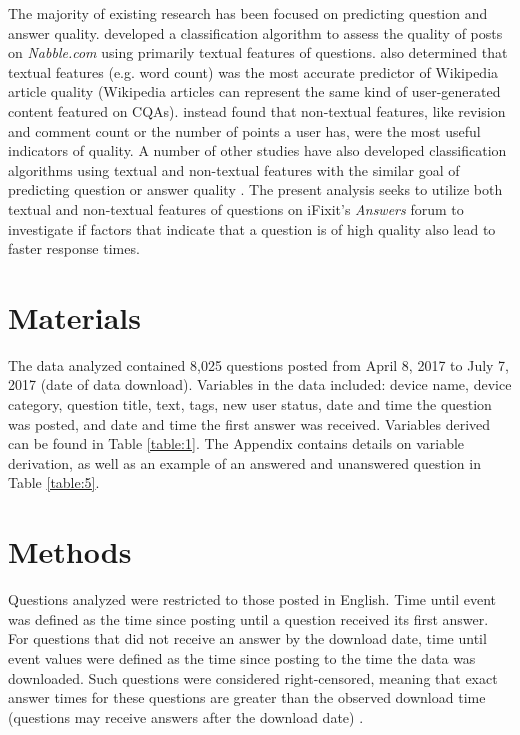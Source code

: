 \documentclass[]{interact}\usepackage[]{graphicx}\usepackage[]{color}
\begin{document}
The majority of existing research has been focused on predicting question and answer quality. \cite{Weimer2007} developed a classification algorithm to assess the quality of posts on \textit{Nabble.com} using primarily textual features of questions. \cite{Blumenstock2008} also determined that textual features (e.g. word count) was the most accurate predictor of Wikipedia article quality (Wikipedia articles can represent the same kind of user-generated content featured on CQAs). \cite{Fu2015} instead found that non-textual features, like revision and comment count or the number of points a user has, were the most useful indicators of quality. A number of other studies have also developed classification algorithms using textual and non-textual features with the similar goal of predicting question or answer quality \cite{Yao2015, Toba2014, Ponzanelli2014a, Ravi2014}. The present analysis seeks to utilize both textual and non-textual features of questions on iFixit's \textit{Answers} forum to investigate if factors that indicate that a question is of high quality also lead to faster response times.


\section{Materials}

The data analyzed contained 8,025 questions posted from April 8, 2017 to July 7, 2017 (date of data download). Variables in the data included: device name, device category, question title, text, tags, new user status, date and time the question was posted, and date and time the first answer was received. Variables derived can be found in Table \ref{table:1}. The Appendix contains details on variable derivation, as well as an example of an answered and unanswered question in Table \ref{table:5}. 


\section{Methods}

Questions analyzed were restricted to those posted in English. Time until event was defined as the time since posting until a question received its first answer. For questions that did not receive an answer by the download date, time until event values were defined as the time since posting to the time the data was downloaded. Such questions were considered right-censored, meaning that exact answer times for these questions are greater than the observed download time (questions may receive answers after the download date) \cite{Kleinbaum2011}. 
\end{document}
